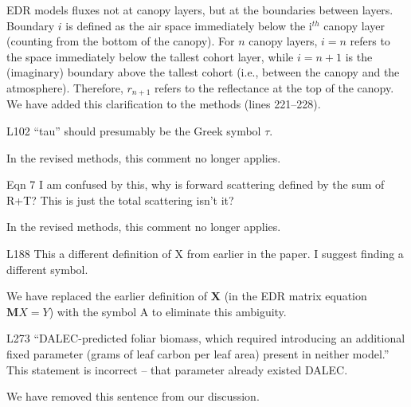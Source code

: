 EDR models fluxes not at canopy layers, but at the boundaries between layers.
Boundary $i$ is defined as the air space immediately below the i$^{th}$ canopy layer (counting from the bottom of the canopy).
For $n$ canopy layers, $i = n$ refers to the space immediately below the tallest cohort layer, while $i = n+1$ is the (imaginary) boundary above the tallest cohort (i.e., between the canopy and the atmosphere).
Therefore, $r_{n+1}$ refers to the reflectance at the top of the canopy.
We have added this clarification to the methods (lines 221--228).

\begin{reviewer}
L102 “tau” should presumably be the Greek symbol $\tau$.
\end{reviewer}

In the revised methods, this comment no longer applies.

\begin{reviewer}
Eqn 7 I am confused by this, why is forward scattering defined by the sum of R+T? This is just the total scattering isn’t it?
\end{reviewer}

In the revised methods, this comment no longer applies.

\begin{reviewer}
L188 This a different definition of X from earlier in the paper. I suggest finding a different symbol.
\end{reviewer}

We have replaced the earlier definition of $\mathbf{X}$ (in the EDR matrix equation $\mathbf{M}{X} = {Y}$) with the symbol A to eliminate this ambiguity.

\begin{reviewer}
L273 “DALEC-predicted foliar biomass, which required introducing an additional fixed parameter (grams of leaf carbon per leaf area) present in neither model.” This statement is incorrect – that parameter already existed DALEC.
\end{reviewer}

We have removed this sentence from our discussion.
